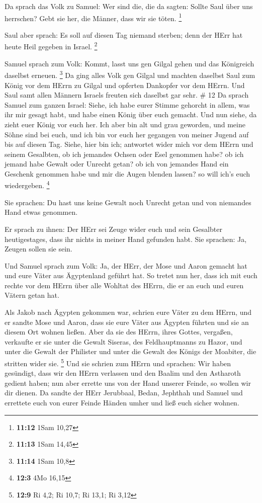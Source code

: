  Da sprach das Volk zu Samuel: Wer sind die, die da sagten:
Sollte Saul über uns herrschen? Gebt sie her, die Männer, dass wir sie
töten. \footnote{\textbf{11:12} 1Sam 10,27}

 Saul aber sprach: Es soll auf diesen Tag niemand sterben;
denn der HErr hat heute Heil gegeben in Israel. \footnote{\textbf{11:13}
  1Sam 14,45}

 Samuel sprach zum Volk: Kommt, lasst uns gen Gilgal gehen
und das Königreich daselbst erneuen. \footnote{\textbf{11:14} 1Sam 10,8}
 Da ging alles Volk gen Gilgal und machten daselbst Saul
zum König vor dem HErrn zu Gilgal und opferten Dankopfer vor dem HErrn.
Und Saul samt allen Männern Israels freuten sich daselbst gar sehr. \#
12  Da sprach Samuel zum ganzen Israel: Siehe, ich habe
eurer Stimme gehorcht in allem, was ihr mir gesagt habt, und habe einen
König über euch gemacht.  Und nun siehe, da zieht euer König
vor euch her. Ich aber bin alt und grau geworden, und meine Söhne sind
bei euch, und ich bin vor euch her gegangen von meiner Jugend auf bis
auf diesen Tag.  Siehe, hier bin ich; antwortet wider mich
vor dem HErrn und seinem Gesalbten, ob ich jemandes Ochsen oder Esel
genommen habe? ob ich jemand habe Gewalt oder Unrecht getan? ob ich von
jemandes Hand ein Geschenk genommen habe und mir die Augen blenden
lassen? so will ich's euch wiedergeben. \footnote{\textbf{12:3} 4Mo
  16,15}

 Sie sprachen: Du hast uns keine Gewalt noch Unrecht getan
und von niemandes Hand etwas genommen.

 Er sprach zu ihnen: Der HErr sei Zeuge wider euch und sein
Gesalbter heutigestages, dass ihr nichts in meiner Hand gefunden habt.
Sie sprachen: Ja, Zeugen sollen sie sein.

 Und Samuel sprach zum Volk: Ja, der HErr, der Mose und
Aaron gemacht hat und eure Väter aus Ägyptenland geführt hat.
 So tretet nun her, dass ich mit euch rechte vor dem HErrn
über alle Wohltat des HErrn, die er an euch und euren Vätern getan hat.

 Als Jakob nach Ägypten gekommen war, schrien eure Väter zu
dem HErrn, und er sandte Mose und Aaron, dass sie eure Väter aus Ägypten
führten und sie an diesem Ort wohnen ließen.  Aber da sie
des HErrn, ihres Gottes, vergaßen, verkaufte er sie unter die Gewalt
Siseras, des Feldhauptmanns zu Hazor, und unter die Gewalt der Philister
und unter die Gewalt des Königs der Moabiter, die stritten wider sie.
\footnote{\textbf{12:9} Ri 4,2; Ri 10,7; Ri 13,1; Ri 3,12} 
Und sie schrien zum HErrn und sprachen: Wir haben gesündigt, dass wir
den HErrn verlassen und den Baalim und den Astharoth gedient haben; nun
aber errette uns von der Hand unserer Feinde, so wollen wir dir dienen.
 Da sandte der HErr Jerubbaal, Bedan, Jephthah und Samuel
und errettete euch von eurer Feinde Händen umher und ließ euch sicher
wohnen.

